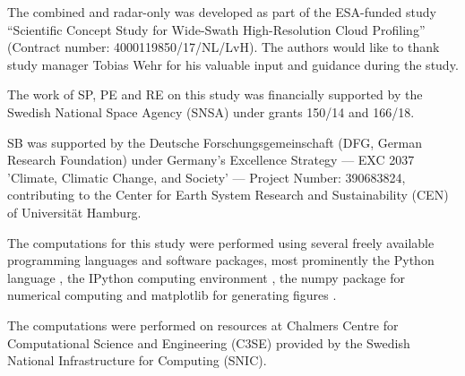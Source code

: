 \documentclass[journal abbreviation, manuscript]{copernicus}
\begin{document}

\appendixfigures  %

\appendixtables   %






\begin{acknowledgements}
The combined and radar-only was developed as part of the ESA-funded study
``Scientific Concept Study for Wide-Swath High-Resolution Cloud Profiling''
(Contract number: 4000119850/17/NL/LvH). The authors would like to thank
study manager Tobias Wehr for his valuable input and guidance during the study.

The work of SP, PE and RE on this study was financially supported by the Swedish National Space Agency
(SNSA) under grants 150/14 and 166/18.

SB was supported by the Deutsche Forschungsgemeinschaft (DFG, German Research
Foundation) under Germany's Excellence Strategy --- EXC 2037 'Climate, Climatic
Change, and Society' --- Project Number: 390683824, contributing to the Center
for Earth System Research and Sustainability (CEN) of Universit\"{a}t Hamburg.

The computations for this study were performed using several freely available programming
languages and software packages, most prominently the Python language
\citep{python}, the IPython computing environment \citep{ipython}, the numpy
package for numerical computing \citep{numpy} and matplotlib for generating
figures \citep{matplotlib}.

The computations were performed on resources at Chalmers Centre for
Computational Science and Engineering (C3SE) provided by the Swedish National
Infrastructure for Computing (SNIC).
\end{acknowledgements}
\end{document}
